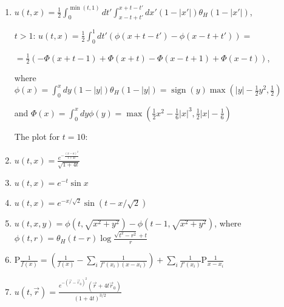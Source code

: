 \documentclass[a4paper,11pt]{article}
\begin{document}
\begin{enumerate}
\item\label{item:33} \(u(t,x)=\frac12 \int_0^{\min(t,1)}dt'\int_{x-t+t'}^{x+t-t'}dx'(1-|x'|)\theta_H(1-|x'|)\),

\(t>1\): \(u(t,x)=\frac12 \int_0^1 dt' \left(\phi(x+t-t')-\phi(x-t+t')\right)=\)

\(=\frac12 \left(-\Phi(x+t-1)+\Phi(x+t)-\Phi(x-t+1)+\Phi(x-t) \right)\),

where \(\phi(x)=\int_0^xdy (1-|y|)\theta_H(1-|y|) = \operatorname{sign}(y) \max\left(|y|-\frac12 y^2,\frac12\right)\)

and \(\Phi(x)=\int_0^xdy \phi(y) = \max(\frac12 x^2-\frac1{6}|x|^3,\frac12 |x| - \frac1{6})\)

The plot for \(t=10\):
\begin{center}
\end{center}

\item \label{item:34}\(u(t,x)=\frac{e^{-\frac{(x-a)^2}{1+4t}}}{\sqrt{1+4t}}\)

\item\label{item:35} \(u(t,x)=e^{-t} \sin x\)

\item\label{item:35} \(u(t,x)=e^{-x/\sqrt{2}}\sin \left(t-x/\sqrt{2}\right)\)

\item\label{item:25} \(u(t,x,y)=\phi(t,\sqrt{x^2+y^2})-\phi(t-1,\sqrt{x^2+y^2})\),
where \(\phi(t,r)=\theta_H(t-r)\log \frac{\sqrt{t^2-r^2}+t}{r}\)

\item\label{item:36} \(\mathrm{P} \frac1{f(x)} = \left(\frac1{f(x)}-\sum_i \frac1{f'(x_i)(x-x_i)} \right) + \sum_i \frac1{f'(x_i)} \mathrm{P} \frac1{x-x_i}\)

\item\label{item:37} \(u(t,\vec{r}) = \frac{e^{-(\vec{r}-\vec{r}_0)^2} \left(\vec{r}+4 t \vec{r}_0\right)}{(1+4t)^{3/2}}\)


\end{enumerate}
\end{document}
